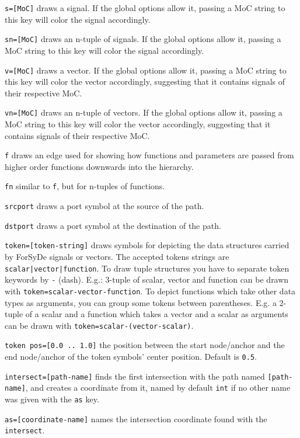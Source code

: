 \documentclass[10pt]{article}
\newenvironment{optionslist}[0]{ 
\begin{list}{}{
	\setlength{\itemindent}{-10pt}
	\setlength{\itemsep}{0pt}
	\setlength{\parsep}{0pt}
}}{\end{list}}
\begin{document}
\begin{optionslist}
\item \texttt{s=[MoC]} draws a signal. If the global options allow it, passing a MoC string to this key will color the signal accordingly. 
\item \texttt{sn=[MoC]} draws an n-tuple of signals. If the global options allow it, passing a MoC string to this key will color the signal accordingly. 
\item \texttt{v=[MoC]} draws a vector. If the global options allow it, passing a MoC string to this key will color the vector accordingly, suggesting that it contains signals of their respective MoC.
\item \texttt{vn=[MoC]} draws an n-tuple of vectors. If the global options allow it, passing a MoC string to this key will color the vector accordingly, suggesting that it contains signals of their respective MoC.
\item \texttt{f} draws an edge used for showing how functions and parameters are passed from higher order functions downwards into the hierarchy.  
\item \texttt{fn} similar to \texttt{f}, but for n-tuples of functions.  
\item \texttt{srcport} draws a port symbol at the source of the path.
\item \texttt{dstport} draws a port symbol at the destination of the path.
\item \texttt{token=[token-string]} draws symbols for depicting the data structures carried by ForSyDe signals or vectors. The accepted tokens strings are \texttt{scalar|vector|function}. To draw tuple structures you have to separate token keywords by \texttt{-} (dash). E.g.: 3-tuple of scalar,  vector and function can be drawn with \texttt{token=scalar-vector-function}. To depict functions which take other data types as arguments, you can group some tokens between parentheses. E.g. a 2-tuple of a scalar and a function which takes a vector and a scalar as arguments can be drawn with \texttt{token=scalar-(vector-scalar)}.
\item \texttt{token pos=[0.0 .. 1.0]} the position between the start node/anchor and the end node/anchor of the token symbols' center position. Default is \texttt{0.5}.
\item \texttt{intersect=[path-name]} finds the first intersection with the path named \texttt{[path-name]}, and creates a coordinate from it, named by default \texttt{int} if no other name was given with the \texttt{as} key.
\item \texttt{as=[coordinate-name]} names the intersection coordinate found with the \texttt{intersect}.

\end{optionslist}
\end{document}
